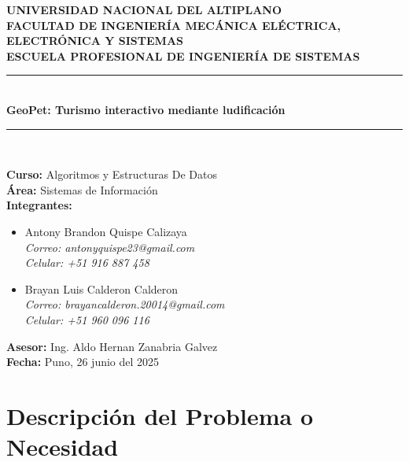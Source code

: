 \documentclass[12pt]{article}
\begin{document}
\begin{titlepage}
\begin{center}
\large

\textbf{\LARGE UNIVERSIDAD NACIONAL DEL ALTIPLANO}\\[0.5cm]
\textbf{\normalsize FACULTAD DE INGENIERÍA MECÁNICA ELÉCTRICA, ELECTRÓNICA Y SISTEMAS}\\[0.5cm]
\textbf{\normalsize ESCUELA PROFESIONAL DE INGENIERÍA DE SISTEMAS}\\[1.5cm]
\rule{\linewidth}{0.5mm}\\
\textbf{\Huge GeoPet: Turismo interactivo mediante ludificación}\\
\rule{\linewidth}{0.5mm}\\[1cm]

\begin{flushleft}
\textbf{Curso:} Algoritmos y Estructuras De Datos\\[0.5cm]
\textbf{Área:} Sistemas de Información\\[1cm]

\textbf{Integrantes:}
\begin{itemize}
    \item Antony Brandon Quispe Calizaya \\
    \textit{Correo: antonyquispe23@gmail.com} \\
    \textit{Celular: +51 916 887 458}
    \item Brayan Luis Calderon Calderon \\
    \textit{Correo: brayancalderon.20014@gmail.com} \\
    \textit{Celular: +51 960 096 116}
\end{itemize}

\vspace{0.5cm}

\textbf{Asesor:} Ing. Aldo Hernan Zanabria Galvez\\[1cm]

\textbf{Fecha:} Puno, 26 junio del 2025
\end{flushleft}

\vfill

\end{center}
\end{titlepage}




\section{Descripción del Problema o Necesidad}
\end{document}
